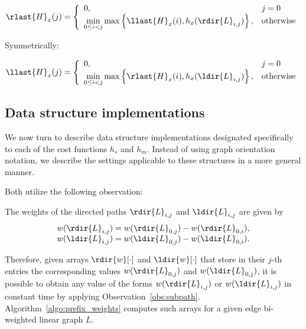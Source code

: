 \begin{equation}\label{eq:Hr}
\rlast{H}_x(j) = \left\{\begin{array}{ll}
0, & j = 0\\
\min\limits_{0 \leq i < j}\max\left\{\llast{H}_x(i), h_x(\rdir{L}_{i, j})\right\}, & \text{otherwise}\\
\end{array}\right.
\end{equation}

Symmetrically: 

\begin{equation}\label{eq:Hl}
\llast{H}_x(j) = \left\{\begin{array}{ll}
0, & j = 0\\
\min\limits_{0 \leq i < j}\max\left\{\rlast{H}_x(i), h_x(\ldir{L}_{i, j})\right\}, & \text{otherwise}\\
\end{array}\right.
\end{equation}


\subsection{Data structure implementations}
We now turn to describe data structure implementations designated specifically to each of the cost functions $h_s$ and $h_m$. Instead of using graph orientation notation, we describe the settings applicable to these structures in a more general manner.

Both utilize the following observation:

\begin{observation}
	\label{obs:subpath}
	The weights of the directed paths $\rdir{L}_{i, j}$ and $\ldir{L}_{i, j}$ are given by 	
	$$ \begin{array}{l}
		w(\rdir{L}_{i, j}) = w(\rdir{L}_{0, j}) - w(\rdir{L}_{0, i}), \\	
		w(\ldir{L}_{i, j}) = w(\ldir{L}_{0, j}) - w(\ldir{L}_{0, i}).
	\end{array}	$$
\end{observation}

Therefore, given arrays $\rdir{w}[\cdot]$ and $\ldir{w}[\cdot]$ that store in their $j$-th entries the corresponding values $w(\rdir{L}_{0, j})$ and $w(\ldir{L}_{0, j})$, it is possible to obtain any value of the forms $w(\rdir{L}_{i, j})$ or $w(\ldir{L}_{i, j})$ in constant time by applying Observation~\ref{obs:subpath}. Algorithm~\ref{algo:prefix_weights} computes such arrays for a given edge bi-weighted linear graph $L$.	


